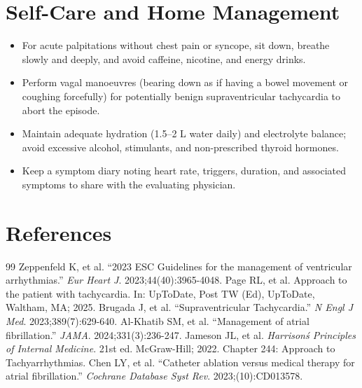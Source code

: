 \section*{Self-Care and Home Management}
\begin{itemize}
  \item For acute palpitations without chest pain or syncope, sit down, breathe slowly and deeply, and avoid caffeine, nicotine, and energy drinks.
  \item Perform vagal manoeuvres (bearing down as if having a bowel movement or coughing forcefully) for potentially benign supraventricular tachycardia to abort the episode.
  \item Maintain adequate hydration (1.5--2 L water daily) and electrolyte balance; avoid excessive alcohol, stimulants, and non-prescribed thyroid hormones.
  \item Keep a symptom diary noting heart rate, triggers, duration, and associated symptoms to share with the evaluating physician.
\end{itemize}

\section*{References}
\begin{thebibliography}{99}
 Zeppenfeld K, et al. ``2023 ESC Guidelines for the management of ventricular arrhythmias.'' \emph{Eur Heart J}. 2023;44(40):3965-4048.
 Page RL, et al. Approach to the patient with tachycardia. In: UpToDate, Post TW (Ed), UpToDate, Waltham, MA; 2025.
 Brugada J, et al. ``Supraventricular Tachycardia.'' \emph{N Engl J Med}. 2023;389(7):629-640.
 Al-Khatib SM, et al. ``Management of atrial fibrillation.'' \emph{JAMA}. 2024;331(3):236-247.
 Jameson JL, et al. \emph{Harrison\'s Principles of Internal Medicine}. 21st ed. McGraw-Hill; 2022. Chapter 244: Approach to Tachyarrhythmias.
 Chen LY, et al. ``Catheter ablation versus medical therapy for atrial fibrillation.'' \emph{Cochrane Database Syst Rev}. 2023;(10):CD013578.
\end{thebibliography}
